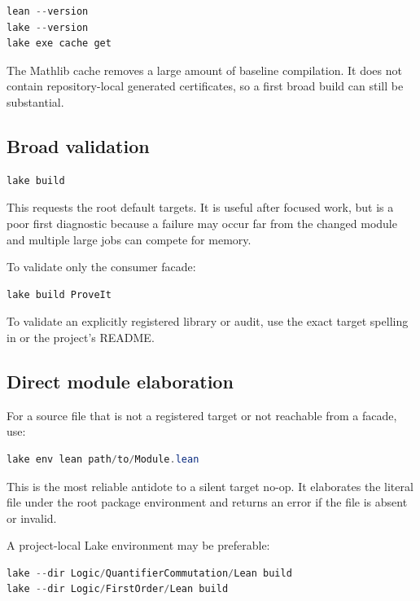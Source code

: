 \documentclass[
  10pt,
  a4paper,
  twoside,
  open=any,
  parskip=half,
  headings=big
]{scrreprt}
\newcommand{\code}[1]{\texttt{\detokenize{#1}}}
\begin{document}
\begin{lstlisting}[language=PowerShell]
lean --version
lake --version
lake exe cache get
\end{lstlisting}

The Mathlib cache removes a large amount of baseline compilation.  It does not
contain repository-local generated certificates, so a first broad build can
still be substantial.

\subsection{Broad validation}

\begin{lstlisting}[language=PowerShell]
lake build
\end{lstlisting}

This requests the root default targets.  It is useful after focused work, but
is a poor first diagnostic because a failure may occur far from the changed
module and multiple large jobs can compete for memory.

To validate only the consumer facade:

\begin{lstlisting}[language=PowerShell]
lake build ProveIt
\end{lstlisting}

To validate an explicitly registered library or audit, use the exact target
spelling in \code{lakefile.toml} or the project's README.

\subsection{Direct module elaboration}

For a source file that is not a registered target or not reachable from a
facade, use:

\begin{lstlisting}[language=PowerShell]
lake env lean path/to/Module.lean
\end{lstlisting}

This is the most reliable antidote to a silent target no-op.  It elaborates the
literal file under the root package environment and returns an error if the
file is absent or invalid.

A project-local Lake environment may be preferable:

\begin{lstlisting}[language=PowerShell]
lake --dir Logic/QuantifierCommutation/Lean build
lake --dir Logic/FirstOrder/Lean build
\end{lstlisting}
\end{document}
